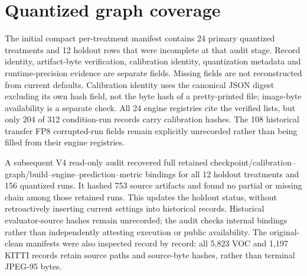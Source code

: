 \documentclass[10pt]{article}
\newcommand{\DeltaE}{\Delta E}
\begin{document}
\begin{table}[htbp]
\centering\small
\caption{Post hoc holdout point-sign diagnostic. A disagreement requires $G_c>0$
and $\Delta E<0$. The last two columns concern only those cells and use
multiplicity-unadjusted paired percentile intervals.}
\label{tab:holdout-interpretation}

\end{table}

\begin{table}[htbp]
\centering
\caption{Sensitivity of the 56 positive-raw-gap to negative-$\DeltaE$
point-sign disagreements to minimum interaction magnitude. Intervals are paired
image-bootstrap percentile intervals and are not multiplicity-adjusted.}
\label{tab:decision-reversal-sensitivity}
\small
\resizebox{0.86\textwidth}{!}{}
\end{table}

\FloatBarrier

\section{Quantized graph coverage}

The initial compact per-treatment manifest contains 24 primary quantized treatments and 12 holdout rows that were incomplete at that audit stage. Record identity, artifact-byte verification, calibration identity, quantization metadata and runtime-precision evidence are separate fields. Missing fields are not reconstructed from current defaults. Calibration identity uses the canonical JSON digest excluding its own hash field, not the byte hash of a pretty-printed file; image-byte availability is a separate check. All 24 engine registries cite the verified lists, but only 204 of 312 condition-run records carry calibration hashes. The 108 historical transfer FP8 corrupted-run fields remain explicitly unrecorded rather than being filled from their engine registries.

A subsequent V4 read-only audit recovered full retained checkpoint/calibration--graph/build--engine--prediction--metric bindings for all 12 holdout treatments and 156 quantized runs. It hashed 753 source artifacts and found no partial or missing chain among those retained runs. This updates the holdout status, without retroactively inserting current settings into historical records. Historical evaluator-source hashes remain unrecorded; the audit checks internal bindings rather than independently attesting execution or public availability. The original-clean manifests were also inspected record by record: all 5,823 VOC and 1,197 KITTI records retain source paths and source-byte hashes, rather than terminal JPEG-95 bytes.
\end{document}
